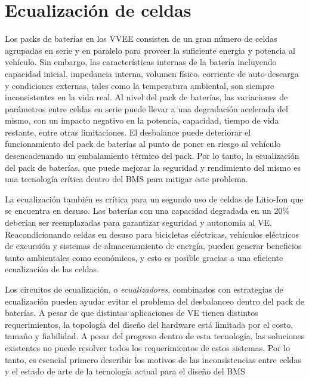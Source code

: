 \section{Ecualización de celdas}\label{cell_balancing_theory}

Los packs de bater\'ias en los \acrshort{VVEE} consisten de un gran n\'umero de
celdas agrupadas en serie y en paralelo para proveer la suficiente energia y
potencia al veh\'iculo. Sin embargo, las caracter\'isticas internas de la
bater\'ia incluyendo capacidad inicial, impedancia interna, volumen f\'isico,
corriente de auto-descarga y condiciones externas, tales como la
temperatura ambiental, son siempre inconsistentes en la vida real. Al nivel del
pack de bater\'ias, las variaciones de par\'ametros entre celdas en serie puede
llevar a una degradaci\'on acelerada del mismo, con un impacto negativo en la
potencia, capacidad, tiempo de vida restante, entre otras limitaciones. El
desbalance puede deteriorar el funcionamiento del pack de bater\'ias al punto de 
poner en riesgo al veh\'iculo desencadenando un embalamiento t\'ermico del pack. 
Por lo tanto, la ecualizaci\'on del pack de bater\'ias, que puede mejorar la 
seguridad y rendimiento del mismo es una tecnolog\'ia cr\'itica dentro del 
\acrshort{BMS} para mitigar este problema.

La ecualizaci\'on tambi\'en es cr\'itica para un segundo uso de celdas de
Litio-Ion que se encuentra en desuso. Las bater\'ias con una capacidad degradada
en un 20\% deber\'ian ser reemplazadas para garantizar seguridad y autonom\'ia
al \acrshort{VE}. Reacondicionando celdas en desuso para bicicletas
el\'ectricas, veh\'iculos el\'ectricos de excursi\'on y sistemas de
almacenamiento de energ\'ia, pueden generar beneficios tanto ambientales como
econ\'omicos, y esto es posible gracias a una eficiente ecualizaci\'on de las
celdas.

Los circuitos de ecualizaci\'on, o \emph{ecualizadores}, combinados con
estrategias de ecualizaci\'on pueden ayudar evitar el problema del desbalanceo
dentro del pack de bater\'ias. A pesar de que distintas aplicaciones de
\acrshort{VE} tienen distintos requerimientos, la topolog\'ia del diseño del
hardware est\'a limitada por el costo, tamaño y fiabilidad. A pesar del progreso
dentro de esta tecnolog\'ia, las soluciones existentes no puede resolver todos
los requerimientos de estos sistemas. Por lo tanto, es esencial primero
describir los motivos de las inconsistencias entre celdas y el estado de arte de
la tecnolog\'ia actual para el diseño del \acrshort{BMS}

